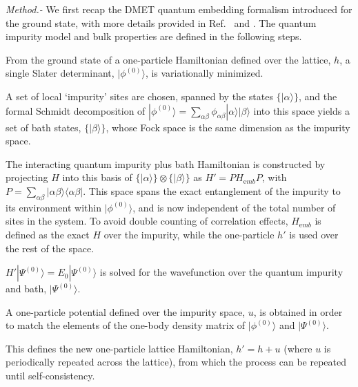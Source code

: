 \documentclass[aps,twocolumn,nobibnotes]{revtex4}
\begin{document}
\emph{Method.-} We first recap the DMET quantum embedding formalism introduced for the ground state, with more details provided in
Ref.~ and . The 
quantum impurity model and bulk properties are defined in the following steps.
\begin{inparaenum}
\item From the ground state of a one-particle Hamiltonian defined over the lattice, $h$, a single Slater determinant, $|\phi^{(0)}\rangle$, is variationally minimized.
\item A set of local `impurity' sites are chosen, spanned by the states $\{ |\alpha \rangle \}$, and the formal Schmidt decomposition of $|\phi^{(0)}\rangle = \sum_{\alpha \beta} \phi_{\alpha \beta} |\alpha \rangle |\beta \rangle$ into this space
yields a set of bath states, $\{ |\beta \rangle \}$, whose Fock space is the same dimension as the impurity space.
\item The interacting quantum impurity plus bath Hamiltonian is constructed by projecting $H$ into this basis 
of $\{ | \alpha \rangle \} \otimes \{ | \beta \rangle \}$ as $H'=PH_{\mathrm emb}P$, 
with $P = \sum_{\alpha \beta} |\alpha \beta \rangle \langle \alpha \beta |$. This space spans the exact entanglement of the impurity to its environment 
within $|\phi^{(0)}\rangle$, and is now independent of the total number of sites in the system. To avoid double counting
of correlation effects, $H_{\mathrm emb}$ is defined as the exact $H$ over the impurity, while the one-particle $h'$ is used over the rest of the space.
\item $H'|\Psi^{(0)} \rangle = E_0 |\Psi^{(0)} \rangle$ is solved for the wavefunction over the quantum impurity and bath, $|\Psi^{(0)} \rangle$.
\item A one-particle potential defined over the impurity space, $u$, is obtained in order to match the elements of the one-body density matrix of $|\phi^{(0)}\rangle$ and $|\Psi^{(0)} \rangle$.
\item This defines the new one-particle lattice Hamiltonian, $h' = h + u$ (where $u$ is periodically repeated across the lattice), 
from which the process can be repeated until self-consistency.
\end{inparaenum}
\end{document}
